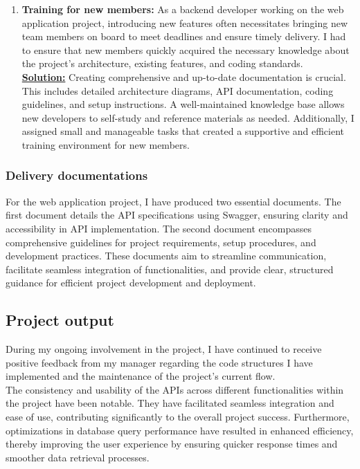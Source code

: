 \begin{enumerate}
        \item \textbf{Training for new members:} As a backend developer working on the web application project, introducing new features often necessitates bringing new team members on board to meet deadlines and ensure timely delivery. I had to ensure that new members quickly acquired the necessary knowledge about the project’s architecture, existing features, and coding standards. \\ 
        \textbf{\underline{Solution:}} Creating comprehensive and up-to-date documentation is crucial. This includes detailed architecture diagrams, API documentation, coding guidelines, and setup instructions. A well-maintained knowledge base allows new developers to self-study and reference materials as needed. Additionally, I assigned small and manageable tasks that created a supportive and efficient training environment for new members.
    \end{enumerate}


    \subsubsection{Delivery documentations}
    For the web application project, I have produced two essential documents. The first document details the API specifications using Swagger, ensuring clarity and accessibility in API implementation. The second document encompasses comprehensive guidelines for project requirements, setup procedures, and development practices. These documents aim to streamline communication, facilitate seamless integration of functionalities, and provide clear, structured guidance for efficient project development and deployment.

    

\subsection{Project output}

During my ongoing involvement in the project, I have continued to receive positive feedback from my manager regarding the code structures I have implemented and the maintenance of the project's current flow. \\

\noindent The consistency and usability of the APIs across different functionalities within the project have been notable. They have facilitated seamless integration and ease of use, contributing significantly to the overall project success. Furthermore, optimizations in database query performance have resulted in enhanced efficiency, thereby improving the user experience by ensuring quicker response times and smoother data retrieval processes. \\

